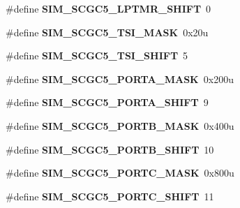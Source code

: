\begin{DoxyCompactItemize}
\#define {\bfseries S\+I\+M\+\_\+\+S\+C\+G\+C5\+\_\+\+L\+P\+T\+M\+R\+\_\+\+S\+H\+I\+FT}~0
\item 
\mbox{\label{group___s_i_m___register___masks_ga12aa3509d85f1dddc69c48821f4f3225}} 
\#define {\bfseries S\+I\+M\+\_\+\+S\+C\+G\+C5\+\_\+\+T\+S\+I\+\_\+\+M\+A\+SK}~0x20u
\item 
\mbox{\label{group___s_i_m___register___masks_ga3e9511b0e9cf6b524a0a405b172038da}} 
\#define {\bfseries S\+I\+M\+\_\+\+S\+C\+G\+C5\+\_\+\+T\+S\+I\+\_\+\+S\+H\+I\+FT}~5
\item 
\mbox{\label{group___s_i_m___register___masks_ga9c4853233394870202cccd7844fc8a56}} 
\#define {\bfseries S\+I\+M\+\_\+\+S\+C\+G\+C5\+\_\+\+P\+O\+R\+T\+A\+\_\+\+M\+A\+SK}~0x200u
\item 
\mbox{\label{group___s_i_m___register___masks_gaa7a1683eaa07a5c5adcaddf4b99ed83a}} 
\#define {\bfseries S\+I\+M\+\_\+\+S\+C\+G\+C5\+\_\+\+P\+O\+R\+T\+A\+\_\+\+S\+H\+I\+FT}~9
\item 
\mbox{\label{group___s_i_m___register___masks_ga5509cf72c7508dd77f0a1a9e631943e8}} 
\#define {\bfseries S\+I\+M\+\_\+\+S\+C\+G\+C5\+\_\+\+P\+O\+R\+T\+B\+\_\+\+M\+A\+SK}~0x400u
\item 
\mbox{\label{group___s_i_m___register___masks_ga491c4800f5437a9e2d235a77819e434d}} 
\#define {\bfseries S\+I\+M\+\_\+\+S\+C\+G\+C5\+\_\+\+P\+O\+R\+T\+B\+\_\+\+S\+H\+I\+FT}~10
\item 
\mbox{\label{group___s_i_m___register___masks_gaac31449d101ad0d05f2bed682571be35}} 
\#define {\bfseries S\+I\+M\+\_\+\+S\+C\+G\+C5\+\_\+\+P\+O\+R\+T\+C\+\_\+\+M\+A\+SK}~0x800u
\item 
\mbox{\label{group___s_i_m___register___masks_gae141a6d4af583e7410d0120442b1012f}} 
\#define {\bfseries S\+I\+M\+\_\+\+S\+C\+G\+C5\+\_\+\+P\+O\+R\+T\+C\+\_\+\+S\+H\+I\+FT}~11
\item 
\mbox{\label{group___s_i_m___register___masks_ga723a55222eb5f8fd25da5c956aa50e7b}} 

\end{DoxyCompactItemize}
